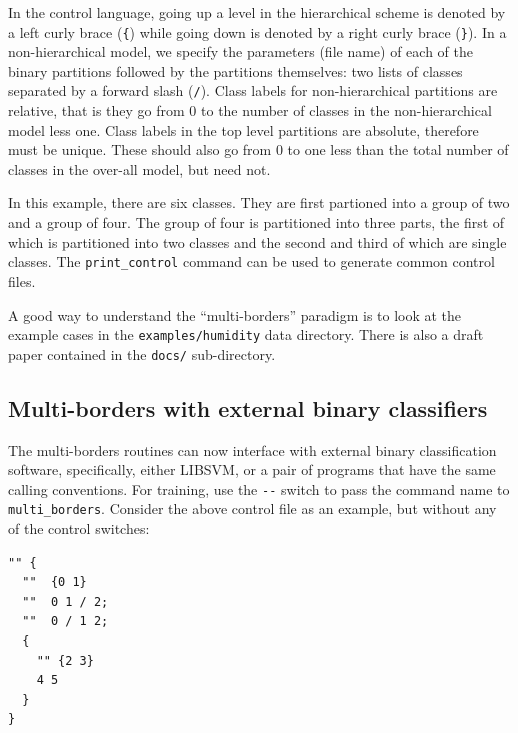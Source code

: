 \documentclass[12pt]{article}
\begin{document}
  In the control language, going up a level in the hierarchical scheme is denoted by a left curly brace (\verb'{') while going down is denoted by a right curly brace (\verb$}$).  In a non-hierarchical model, we specify the parameters (file name) of each of the binary partitions followed by the partitions themselves: two lists of classes separated by a forward slash (\verb'/').  Class labels for non-hierarchical partitions are relative, that is they go from 0 to the number of classes in the non-hierarchical model less one.  Class labels in the top level partitions are absolute, therefore must be unique.  These should also go from 0 to one less than the total number of classes in the over-all model, but need not.

  In this example, there are six classes.  They are first partioned into a group of two and a group of four.  The group of four is partitioned into three parts, the first of which is partitioned into two classes and the second and third of which are single classes. The \verb/print_control/ command can be used to generate common control files.

A good way to understand the ``multi-borders'' paradigm is to look at the example cases in the \verb"examples/humidity" data directory.  There is also a draft paper contained in the \verb"docs/" sub-directory.


\subsection{Multi-borders with external binary classifiers}

The multi-borders routines can now interface with external binary classification software, specifically, either LIBSVM, or a pair of programs that have the same calling conventions.  For training, use the \verb"--" switch to pass the command name to \verb/multi_borders/.  Consider the above control file as an example, but without any of the control switches:

\begin{verbatim}
"" {
  ""  {0 1}
  ""  0 1 / 2;
  ""  0 / 1 2;
  {
    "" {2 3}
    4 5
  } 
} 
\end{verbatim}
\end{document}
